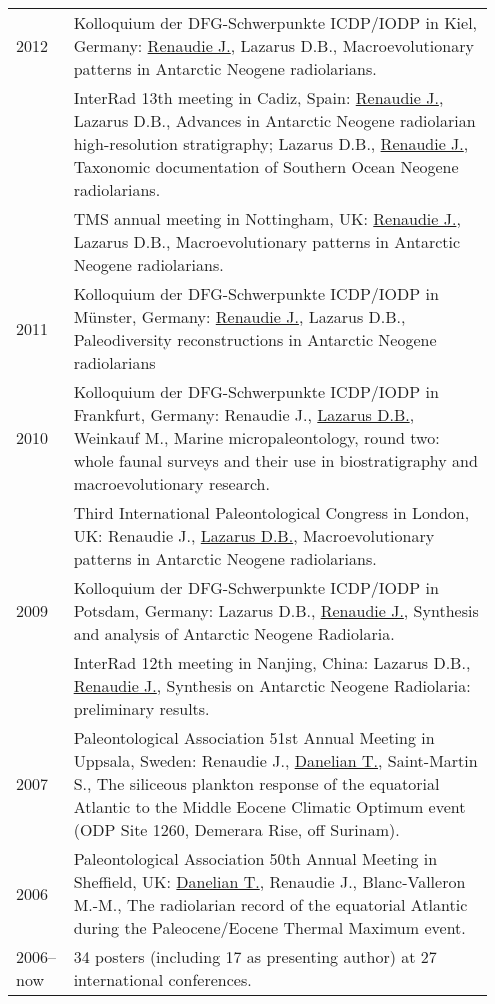 \documentclass[11pt, a4paper]{article}
\begin{document}
\begin{longtable}{@{}p{0.1\linewidth} P{0.85\linewidth}@{}}
2012 & Kolloquium der DFG-Schwerpunkte ICDP/IODP in Kiel, Germany: \underline{Renaudie J.}, Lazarus D.B., Macroevolutionary patterns in Antarctic Neogene radiolarians.\\
 & InterRad 13th meeting in Cadiz, Spain: \underline{Renaudie J.}, Lazarus D.B., Advances in Antarctic Neogene radiolarian high-resolution stratigraphy; Lazarus D.B., \underline{Renaudie J.}, Taxonomic documentation of Southern Ocean Neogene radiolarians.\\
 & TMS annual meeting in Nottingham, UK: \underline{Renaudie J.}, Lazarus D.B., Macroevolutionary patterns in Antarctic Neogene radiolarians.\\
2011 & Kolloquium der DFG-Schwerpunkte ICDP/IODP in Münster, Germany: \underline{Renaudie J.}, Lazarus D.B., Paleodiversity reconstructions in Antarctic Neogene radiolarians\\
2010 & Kolloquium der DFG-Schwerpunkte ICDP/IODP in Frankfurt, Germany: Renaudie J., \underline{Lazarus D.B.}, Weinkauf M., Marine micropaleontology, round two: whole faunal surveys and their use in biostratigraphy and macroevolutionary research.\\
 & Third International Paleontological Congress in London, UK: Renaudie J., \underline{Lazarus D.B.}, Macroevolutionary patterns in Antarctic Neogene radiolarians.\\
2009 & Kolloquium der DFG-Schwerpunkte ICDP/IODP in Potsdam, Germany: Lazarus D.B., \underline{Renaudie J.}, Synthesis and analysis of Antarctic Neogene Radiolaria.\\
 & InterRad 12th meeting in Nanjing, China: Lazarus D.B., \underline{Renaudie J.}, Synthesis on Antarctic Neogene Radiolaria: preliminary results.\\
2007 & Paleontological Association 51st Annual Meeting in Uppsala, Sweden: Renaudie J., \underline{Danelian T.}, Saint-Martin S., The siliceous plankton response of the equatorial Atlantic to the Middle Eocene Climatic Optimum event (ODP Site 1260, Demerara Rise, off Surinam).\\
2006 & Paleontological Association 50th Annual Meeting in Sheffield, UK: \underline{Danelian T.}, Renaudie J., Blanc-Valleron M.-M., The radiolarian record of the equatorial Atlantic during the Paleocene/Eocene Thermal Maximum event.\\
2006--now  & 34 posters (including 17 as presenting author) at 27 international conferences.
\end{longtable}
\end{document}
